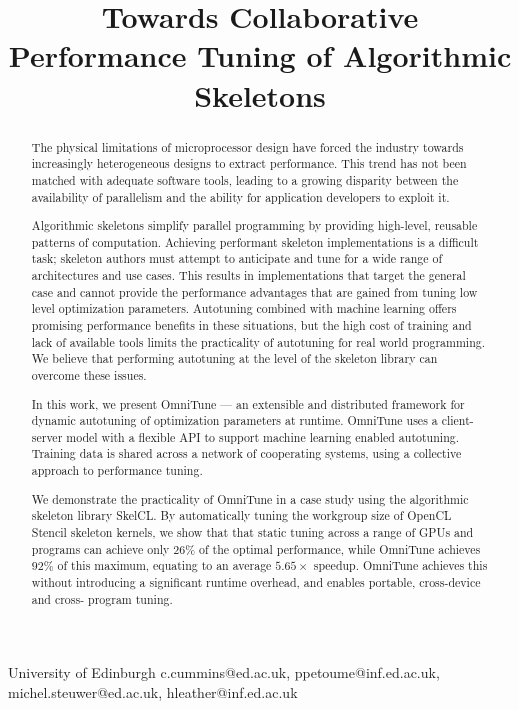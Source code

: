 \documentclass[nonatbib,preprint,nocopyrightspace,9pt]{sigplanconf}
\begin{document}
  \setlength{\pdfpageheight}{\paperheight}
  \setlength{\pdfpagewidth}{\paperwidth}


  \title{Towards Collaborative Performance Tuning of Algorithmic Skeletons}
  {University of Edinburgh}
  {c.cummins@ed.ac.uk, ppetoume@inf.ed.ac.uk, michel.steuwer@ed.ac.uk, hleather@inf.ed.ac.uk}

  \maketitle

  \begin{abstract}
    The physical limitations of microprocessor design have forced the industry
    towards increasingly heterogeneous designs to extract performance. This trend
    has not been matched with adequate software tools, leading to a growing
    disparity between the availability of parallelism and the ability for
    application developers to exploit it.

    Algorithmic skeletons simplify parallel programming by providing high-level,
    reusable patterns of computation. Achieving performant skeleton
    implementations is a difficult task; skeleton authors must attempt to
    anticipate and tune for a wide range of architectures and use cases. This
    results in implementations that target the general case and cannot provide the
    performance advantages that are gained from tuning low level optimization
    parameters. Autotuning combined with machine learning offers promising
    performance benefits in these situations, but the high cost of training and
    lack of available tools limits the practicality of autotuning for real world
    programming. We believe that performing autotuning at the level of the
    skeleton library can overcome these issues.

    In this work, we present OmniTune --- an extensible and distributed framework
    for dynamic autotuning of optimization parameters at runtime. OmniTune uses a
    client-server model with a flexible API to support machine learning enabled
    autotuning. Training data is shared across a network of cooperating systems,
    using a collective approach to performance tuning.

    We demonstrate the practicality of OmniTune in a case study using the
    algorithmic skeleton library SkelCL. By automatically tuning the workgroup
    size of OpenCL Stencil skeleton kernels, we show that that static tuning
    across a range of GPUs and programs can achieve only $26\%$ of the optimal
    performance, while OmniTune achieves $92\%$ of this maximum, equating to an
    average $5.65\times$ speedup. OmniTune achieves this without introducing a
    significant runtime overhead, and enables portable, cross-device and cross-
    program tuning.
  \end{abstract}
\end{document}

